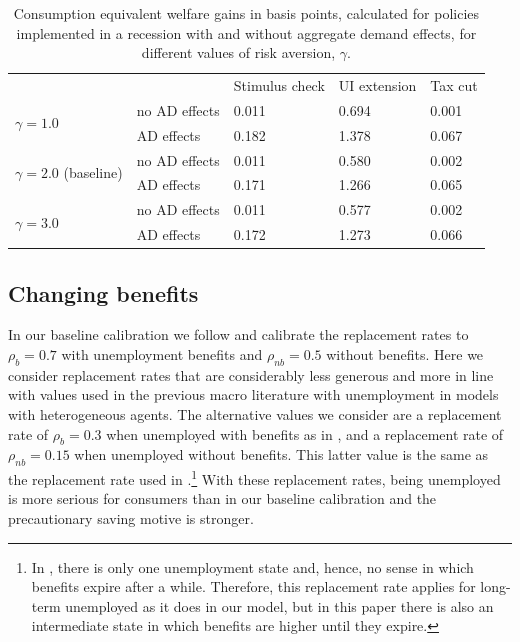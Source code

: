 \documentclass[../HAFiscal]{subfiles}
\begin{document}
\begin{table}[]
	\begin{center}
		\begin{tabular}{@{}lllll@{}}
			\toprule
			&                    & Stimulus check & UI extension & Tax cut \\ \cmidrule(l){1-5} 
			\multirow{2}{*}{$\gamma = 1.0$}            	& no AD effects & 0.011          & 0.694        & 0.001   \\
			& AD effects    & 0.182          & 1.378        & 0.067   \\
			\multirow{2}{*}{$\gamma = 2.0$ (baseline)} 	& no AD effects & 0.011          & 0.580        & 0.002   \\
			& AD effects    & 0.171          & 1.266        & 0.065   \\
			\multirow{2}{*}{$\gamma = 3.0$}            	& no AD effects & 0.011          & 0.577        & 0.002   \\
			& AD effects    & 0.172          & 1.273        & 0.066   \\ \cmidrule(l){1-5} 
		\end{tabular}
		\caption{Consumption equivalent welfare gains in basis points, calculated for policies implemented in a recession with and without aggregate demand effects, for different values of risk aversion, $\gamma$.}
		\label{tab:robustness_gamma_results}
	\end{center}
\end{table}


\subsection{Changing benefits} 
\label{sec:robust_benefits} 

In our baseline calibration we follow \cite{rothstein2017scraping} and calibrate the replacement rates to $\rho_b=0.7$ with unemployment benefits and $\rho_{nb}=0.5$ without benefits. Here we consider replacement rates that are considerably less generous and more in line with values used in the previous macro literature with unemployment in models with heterogeneous agents. The alternative values we consider are a replacement rate of $\rho_{b}=0.3$ when unemployed with benefits as in \cite{carroll2020modeling}, and a replacement rate of $\rho_{nb}=0.15$ when unemployed without benefits. This latter value is the same as the replacement rate used in \cite{den2010computational}.\footnote{In \cite{den2010computational}, there is only one unemployment state and, hence, no sense in which benefits expire after a while. Therefore, this replacement rate applies for long-term unemployed as it does in our model, but in this paper there is also an intermediate state in which benefits are higher until they expire.} With these replacement rates, being unemployed is more serious for consumers than in our baseline calibration and the precautionary saving motive is stronger. 
\end{document}

